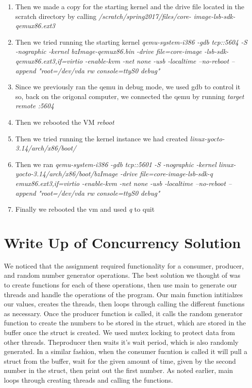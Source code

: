 \begin{enumerate}
    \item Then we made a copy for the starting kernel and the drive file located in the scratch directory by calling \textit{/scratch/spring2017/files/core-    image-lsb-sdk-qemux86.ext3}
    \item Then we tried running the starting kernel \textit{qemu-system-i386 -gdb tcp::5604 -S -nographic -kernel bzImage-qemux86.bin -drive file=core-image    -lsb-sdk-qemux86.ext3,if=virtio -enable-kvm -net none -usb -localtime --no-reboot --append "root=/dev/vda rw console=ttyS0 debug"}
    \item Since we previously ran the qemu in debug mode, we used gdb to control it so, back on the origonal computer, we connected the qemu by running \textit{target remote :5604}
    \item Then we rebooted the VM \textit{reboot}
    \item Then we tried running the kernel instance we had created \textit{linux-yocto-3.14/arch/x86/boot/}
    \item Then we ran \textit{qemu-system-i386 -gdb tcp::5601 -S -nographic -kernel linux-yocto-3.14/arch/x86/boot/bzImage  -drive file=core-image-lsb-sdk-q    emux86.ext3,if=virtio -enable-kvm -net none -usb -localtime --no-reboot --append "root=/dev/vda rw console=ttyS0 debug"}
    \item Finally we rebooted the vm and used \textit{q} to quit
\end{enumerate}

\section{Write Up of Concurrency Solution}
We noticed that the assignment required functionality for a consumer, producer, and random number generator operations. The best solution we thought of was to create functions for each of these operations, then use main to generate our threads and handle the operations of the program. Our main function intitialzes our values, creates the threads, then loops through calling the different functions as necessary. Once the producer function is called, it calls the random generator function to create the numbers to be stored in the struct, which are stored in the buffer once the struct is created. We used mutex locking to protect data from other threads. Theproducer then waits it's wait period, which is also randomly generated. In a similar fashion, when the consumer fucntion is called it will pull a struct from the buffer, wait for the given amount of time, given by the second number in the struct, then print out the first number. As noted earlier, main loops through creating threads and calling the functions. 

